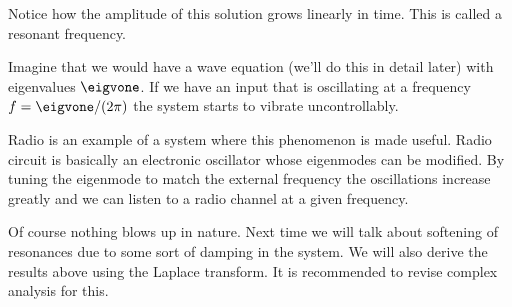 \begin{frame}
	Notice how the amplitude of this solution grows linearly in time. This is called a resonant frequency. 
	
	\pause
	Imagine that we would have a wave equation (we'll do this in detail later) with eigenvalues 
	$ \eigvone $. If we have an input that is oscillating at a frequency $ f = \eigvone/(2\pi) $ the system starts to vibrate uncontrollably. 
	
	\pause
	Radio is an example of a system where this phenomenon is made useful. Radio circuit is basically an electronic oscillator whose eigenmodes can be modified. By tuning the eigenmode to match the external frequency the oscillations increase greatly and we can listen to a radio channel at a given frequency. 
	
	\pause
	Of course nothing blows up in nature. Next time we will talk about softening of resonances due to some sort of damping in the system. We will also derive the results above using the Laplace transform. It is recommended to revise complex analysis for this. 
\end{frame}


